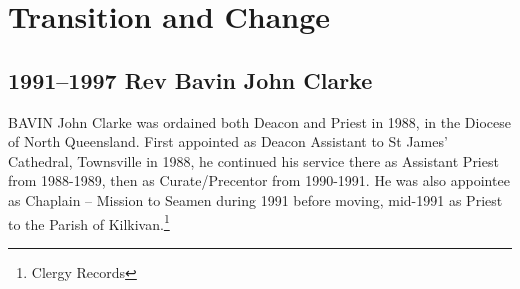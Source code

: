 \balance


\printendnotes[custom]
\setcounter{endnote}{0}
\chapter{Transition and Change}
\nobalance


\section{1991--1997 Rev Bavin John Clarke}



\lettrine[lines=3]{B}{AVIN}
 John Clarke was ordained both Deacon and Priest in 1988, in the Diocese of North Queensland. First appointed as Deacon Assistant to St James' Cathedral, Townsville in 1988, he continued his service there as Assistant Priest from 1988-1989, then as Curate/Precentor from 1990-1991. He was also appointee as Chaplain -- Mission to Seamen during 1991 before moving, mid-1991 as Priest to the Parish of Kilkivan.\footnote{Clergy Records}








